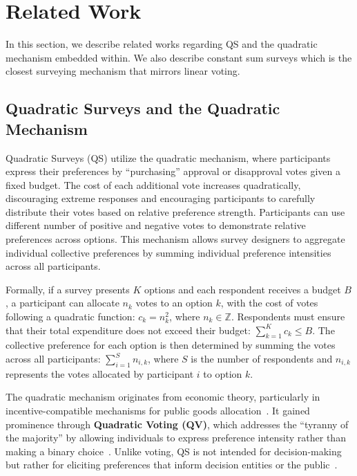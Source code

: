 \section{Related Work}
\label{sec:relatedWorks}
In this section, we describe related works regarding QS and the quadratic mechanism embedded within. We also describe constant sum surveys which is the closest surveying mechanism that mirrors linear voting.

\subsection{Quadratic Surveys and the Quadratic Mechanism}
Quadratic Surveys (QS) utilize the quadratic mechanism, where participants express their preferences by ``purchasing'' approval or disapproval votes given a fixed budget. The cost of each additional vote increases quadratically, discouraging extreme responses and encouraging participants to carefully distribute their votes based on relative preference strength. Participants can use different number of positive and negative votes to demonstrate relative preferences across options. This mechanism allows survey designers to aggregate individual collective preferences by summing individual preference intensities across all participants.

Formally, if a survey presents $K$ options and each respondent receives a budget $B$, a participant can allocate $n_k$ votes to an option $k$, with the cost of votes following a quadratic function: $c_k = n_k^2$, where $n_k \in \mathbb{Z}$. Respondents must ensure that their total expenditure does not exceed their budget: $\sum_{k=1}^{K} c_k \leq B$. The collective preference for each option is then determined by summing the votes across all participants: $\sum_{i=1}^{S} n_{i,k}$, where $S$ is the number of respondents and $n_{i,k}$ represents the votes allocated by participant $i$ to option $k$.

The quadratic mechanism originates from economic theory, particularly in incentive-compatible mechanisms for public goods allocation~\cite{grovesOptimalAllocationPublic1977}. It gained prominence through \textbf{Quadratic Voting (QV)}, which addresses the ``tyranny of the majority'' by allowing individuals to express preference intensity rather than making a binary choice~\cite{posner2018radical}. Unlike voting, QS is not intended for decision-making but rather for eliciting preferences that inform decision entities or the public~\cite{chengOrganizeThenVote2025}.

